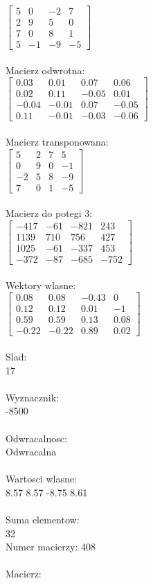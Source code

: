 \documentclass[a4paper,12pt]{article}
\begin{document}
$\begin{bmatrix} 5&0&-2&7\\2&9&5&0\\7&0&8&1\\5&-1&-9&-5 \end{bmatrix}$
\\
\\
Macierz odwrotna:\\

$\begin{bmatrix} 0.03&0.01&0.07&0.06\\0.02&0.11&-0.05&0.01\\-0.04&-0.01&0.07&-0.05\\0.11&-0.01&-0.03&-0.06 \end{bmatrix}$
\\
\\
Macierz transponowana:\\

$\begin{bmatrix} 5&2&7&5\\0&9&0&-1\\-2&5&8&-9\\7&0&1&-5 \end{bmatrix}$
\\
\\
Macierz do potegi 3:\\

$\begin{bmatrix} -417&-61&-821&243\\1139&710&756&427\\1025&-61&-337&453\\-372&-87&-685&-752 \end{bmatrix}$
\\
\\
Wektory wlasne:\\

$\begin{bmatrix} 0.08&0.08&-0.43&0\\0.12&0.12&0.01&-1\\0.59&0.59&0.13&0.08\\-0.22&-0.22&0.89&0.02 \end{bmatrix}$
\\
\\
Slad:\\
17
\\
\\
Wyznacznik:\\
-8500
\\
\\
Odwracalnosc:\\
Odwracalna
\\
\\
Wartosci wlasne:\\
8.57 8.57 -8.75 8.61
\\
\\
Suma elementow:\\
32
\\
\newpage
Numer macierzy:
408
\\
\\
Macierz:\\
\end{document}
